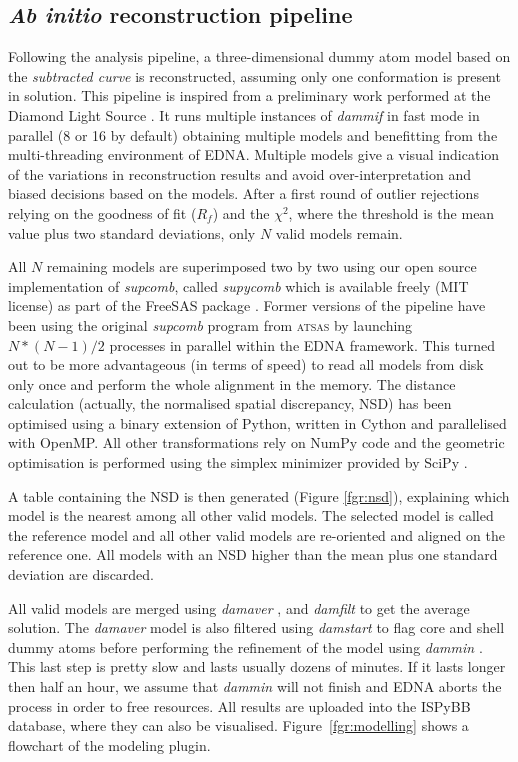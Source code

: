 \documentclass[preprint,pdf]{iucr}              %
\begin{document}
\subsection{\textit{Ab initio} reconstruction pipeline}
\label{abinitio}
Following the analysis pipeline, a three-dimensional dummy atom model based
on the \textit{subtracted curve} is reconstructed, assuming only one
conformation is present in solution.
This pipeline is inspired from a preliminary work
performed at the Diamond Light Source \cite{DiamondSE}.
It runs multiple instances of \textit{dammif} in fast mode in parallel (8 or 16 by default)
obtaining multiple models \cite{dammif} and benefitting from 
the multi-threading environment of EDNA.
Multiple models give a visual indication of the variations in
reconstruction results and avoid over-interpretation and biased decisions
based on the models.
After a first round of outlier rejections relying on the goodness of fit
($R_{f}$) and the $\chi^{2}$, where the threshold is the mean value plus two
standard deviations, only $N$ valid models remain.

All $N$ remaining models are superimposed two by two using
our open source implementation of \textit{supcomb}, called
\textit{supycomb} which is available freely (MIT license) as part of the
FreeSAS package \cite{freesas}.
Former versions of the pipeline have been using the original
\textit{supcomb} \cite{supcomb} program from \textsc{atsas} by launching
$N*(N-1)/2$ processes in parallel within the EDNA framework.
This turned out to be more advantageous (in terms of speed) to read all models
from disk only once and perform the whole alignment in the memory.
The distance calculation (actually, the normalised spatial discrepancy, NSD)
has been optimised using a binary extension of Python, written in Cython
\cite{cython} and parallelised with OpenMP.
All other transformations rely on NumPy \cite{numpy} code and the geometric
optimisation is performed using the simplex minimizer provided by SciPy
\cite{scipy}.

A table containing the NSD is then generated
(Figure \ref{fgr:nsd}), explaining which model is the nearest among all
other valid models. 
The selected model is called the reference model and all other valid
models are re-oriented and aligned on the reference one.
All models with an NSD higher than the mean plus one standard deviation are
discarded.

All valid models are merged using \textit{damaver} \cite{damaver},
and \textit{damfilt} to get the average solution. 
The \textit{damaver} model is also filtered using \textit{damstart} to flag
core and shell dummy atoms before performing the refinement of the model using
\textit{dammin} \cite{dammin}.
This last step is pretty slow and lasts usually dozens of minutes. 
If it lasts longer then half an hour, we assume that \textit{dammin} will not finish and 
EDNA aborts the process in order to free resources. 
All results are uploaded into the ISPyBB database, where they can also be
visualised. 
Figure~\ref{fgr:modelling} shows a flowchart of the modeling plugin.
\end{document}
